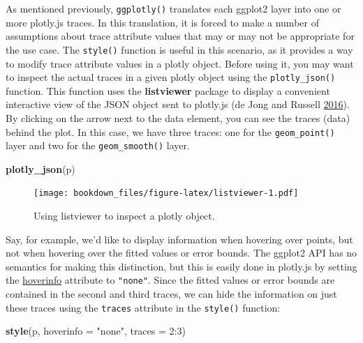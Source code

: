\documentclass[12pt,]{isuthesis}
\newenvironment{Shaded}{\begin{snugshade}}{\end{snugshade}}
\newcommand{\KeywordTok}[1]{\textcolor[rgb]{0.13,0.29,0.53}{\textbf{{#1}}}}
\newcommand{\DataTypeTok}[1]{\textcolor[rgb]{0.13,0.29,0.53}{{#1}}}
\newcommand{\DecValTok}[1]{\textcolor[rgb]{0.00,0.00,0.81}{{#1}}}
\newcommand{\StringTok}[1]{\textcolor[rgb]{0.31,0.60,0.02}{{#1}}}
\newcommand{\NormalTok}[1]{{#1}}
\begin{document}
As mentioned previously, \texttt{ggplotly()} translates each ggplot2
layer into one or more plotly.js traces. In this translation, it is
forced to make a number of assumptions about trace attribute values that
may or may not be appropriate for the use case. The \texttt{style()}
function is useful in this scenario, as it provides a way to modify
trace attribute values in a plotly object. Before using it, you may want
to inspect the actual traces in a given plotly object using the
\texttt{plotly\_json()} function. This function uses the
\textbf{listviewer} package to display a convenient interactive view of
the JSON object sent to plotly.js (de Jong and Russell
\protect\hyperlink{ref-listviewer}{2016}). By clicking on the arrow next
to the data element, you can see the traces (data) behind the plot. In
this case, we have three traces: one for the \texttt{geom\_point()}
layer and two for the \texttt{geom\_smooth()} layer.

\begin{Shaded}
\begin{Highlighting}[]
\KeywordTok{plotly_json}\NormalTok{(p)}
\end{Highlighting}
\end{Shaded}

\begin{figure}[htbp]
\centering
\texttt{[image: bookdown\_files/figure-latex/listviewer-1.pdf]}
\caption{\label{fig:listviewer}Using listviewer to inspect a plotly object.}
\end{figure}

Say, for example, we'd like to display information when hovering over
points, but not when hovering over the fitted values or error bounds.
The ggplot2 API has no semantics for making this distinction, but this
is easily done in plotly.js by setting the
\href{https://plot.ly/r/reference/\#scatter-hoverinfo}{hoverinfo}
attribute to \texttt{"none"}. Since the fitted values or error bounds
are contained in the second and third traces, we can hide the
information on just these traces using the \texttt{traces} attribute in
the \texttt{style()} function:

\begin{Shaded}
\begin{Highlighting}[]
\KeywordTok{style}\NormalTok{(p, }\DataTypeTok{hoverinfo =} \StringTok{"none"}\NormalTok{, }\DataTypeTok{traces =} \DecValTok{2}\NormalTok{:}\DecValTok{3}\NormalTok{)}
\end{Highlighting}
\end{Shaded}
\end{document}

